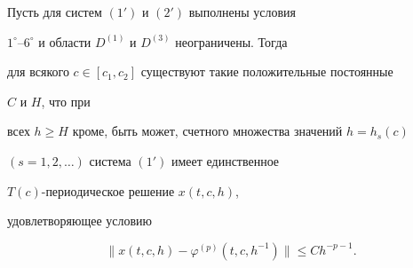 \begin{thm} 


Пусть для систем $(1')$ и $(2')$ выполнены условия 


$1^\circ$--$6^\circ$ и области $D^{(1)}$ и $D^{(3)}$ неограничены. Тогда 


для всякого $c\in[c_1,c_2]$ существуют такие положительные постоянные 


$C$ и $H$, что при 


всех $h\ge H$ кроме, быть может, счетного множества значений $h=h_s(c)$ 


$(s=1,2,\dotsc)$ система $(1{}')$ имеет единственное 


$T(c)$-периодическое решение $x(t,c,h)$, 


удовлетворяющее условию 


\begin{equation} 


\|x(t,c,h)-\varphi^{(p)}(t,c,h^{-1})\|\le C h^{-p-1}. 


\end{equation} 


\end{thm} 


 



